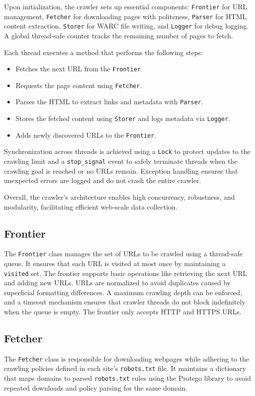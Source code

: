 \documentclass[sigconf]{acmart}
\begin{document}
Upon initialization, the crawler sets up essential components: \texttt{Frontier} for URL management, \texttt{Fetcher} for downloading pages with politeness, \texttt{Parser} for HTML content extraction, \texttt{Storer} for WARC file writing, and \texttt{Logger} for debug logging. A global thread-safe counter tracks the remaining number of pages to fetch.

Each thread executes a method that performs the following steps:
\begin{itemize}
  \item Fetches the next URL from the \texttt{Frontier}.
  \item Requests the page content using \texttt{Fetcher}.
  \item Parses the HTML to extract links and metadata with \texttt{Parser}.
  \item Stores the fetched content using \texttt{Storer} and logs metadata via \texttt{Logger}.
  \item Adds newly discovered URLs to the \texttt{Frontier}.
\end{itemize}

Synchronization across threads is achieved using a \texttt{Lock} to protect updates to the crawling limit and a \texttt{stop\_signal} event to safely terminate threads when the crawling goal is reached or no URLs remain. Exception handling ensures that unexpected errors are logged and do not crash the entire crawler.

Overall, the crawler's architecture enables high concurrency, robustness, and modularity, facilitating efficient web-scale data collection.

\subsection{Frontier}
The \texttt{Frontier} class manages the set of URLs to be crawled using a thread-safe queue. It ensures that each URL is visited at most once by maintaining a \texttt{visited} set. The frontier supports basic operations like retrieving the next URL and adding new URLs. URLs are normalized to avoid duplicates caused by superficial formatting differences. A maximum crawling depth can be enforced, and a timeout mechanism ensures that crawler threads do not block indefinitely when the queue is empty. The frontier only accepts HTTP and HTTPS URLs.

\subsection{Fetcher}
The \texttt{Fetcher} class is responsible for downloading webpages while adhering to the crawling policies defined in each site's \texttt{robots.txt} file. It maintains a dictionary that maps domains to parsed \texttt{robots.txt} rules using the Protego library to avoid repeated downloads and policy parsing for the same domain.
\end{document}
